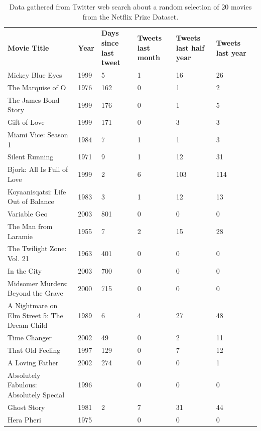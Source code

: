 \begin{table}[H]
\centering
\begin{tabularx}{5.3\textwidth}{ |p{7cm}|p{1cm}|p{1cm}|p{1cm}|p{1cm}|p{1cm}|p{1cm}| }
  \textbf{Movie Title}&\textbf{Year}&\textbf{Days since last tweet}&\textbf{Tweets last month}&\textbf{Tweets last half year}&\textbf{Tweets last year}\\
  \cline{0-5}
Mickey Blue Eyes&1999&5&1&16&26\\
  \cline{0-5}
The Marquise of O&1976&162&0&1&2\\
  \cline{0-5}
The James Bond Story&1999&176&0&1&5\\
  \cline{0-5}
Gift of Love&1999&171&0&3&3\\
  \cline{0-5}
Miami Vice: Season 1&1984&7&1&1&3\\
  \cline{0-5}
Silent Running&1971&9&1&12&31\\
  \cline{0-5}
Bjork: All Is Full of Love&1999&2&6&103&114\\
  \cline{0-5}
Koyaanisqatsi: Life Out of Balance&1983&3&1&12&13\\
  \cline{0-5}
Variable Geo&2003&801&0&0&0\\
  \cline{0-5}
The Man from Laramie&1955&7&2&15&28\\
  \cline{0-5}
The Twilight Zone: Vol. 21&1963&401&0&0&0\\
  \cline{0-5}
In the City&2003&700&0&0&0\\
  \cline{0-5}
Midsomer Murders: Beyond the Grave&2000&715&0&0&0\\
  \cline{0-5}
A Nightmare on Elm Street 5: The Dream Child&1989&6&4&27&48\\
  \cline{0-5}
Time Changer&2002&49&0&2&11\\
  \cline{0-5}
That Old Feeling&1997&129&0&7&12\\
  \cline{0-5}
A Loving Father&2002&274&0&0&1\\
  \cline{0-5}
Absolutely Fabulous: Absolutely Special&1996&&0&0&0\\
  \cline{0-5}
Ghost Story&1981&2&7&31&44\\
  \cline{0-5}
Hera Pheri&1975&&0&0&0
\end{tabularx}
\caption[Stream API capability test data]{Data gathered from Twitter web search about a random selection of 20 movies from the Netflix Prize Dataset.}
\label{table:stream-api-test-data}
\end{table}

